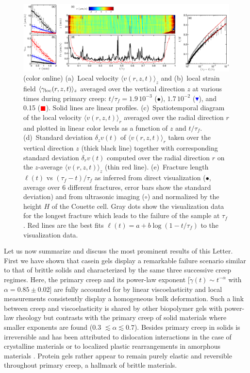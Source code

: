 \documentclass[twocolumn,superscriptaddress,showpacs,preprintnumbers,amsmath,amssymb,prl]{revtex4}
\newcommand\gp{\dot\gamma}
\newcommand\gl{\gamma_{\rm loc}}
\begin{document}
\begin{figure}
\centering
\includegraphics[width=17.5cm,clip]{Fig4.eps}
\caption{(color online) (a)~Local velocity $\langle v(r,z,t)\rangle_z$ and (b)~local strain field $\langle\gl(r,z,t)\rangle_z$ averaged over the vertical direction $z$ at various times during primary creep: $t/\tau_f=1.9\,10^{-3}$ ($\bullet$), $1.7\,10^{-2}$ (\textcolor{blue}{$\blacktriangledown$}), and 0.15 (\textcolor{red}{$\blacksquare$}). Solid lines are linear profiles. (c)~Spatiotemporal diagram of the local velocity $\langle v(r,z,t)\rangle_r$ averaged over the radial direction $r$ and plotted in linear color levels as a function of $z$ and $t/\tau_f$. (d)~Standard deviation $\delta_z v(t)$ of $\langle v(r,z,t)\rangle_r$ taken over the vertical direction $z$ (thick black line) together with corresponding standard deviation $\delta_r v(t)$ computed over the radial direction $r$ on the $z$-average $\langle v(r,z,t)\rangle_z$ (thin red line). (e)~Fracture length $\ell(t)$ vs $(\tau_f-t)/\tau_f$ as inferred from direct visualization ($\bullet$, average over 6 different fractures, error bars show the standard deviation) and from ultrasonic imaging ($\circ$) and normalized by the height $H$ of the Couette cell. Gray dots show the visualization data for the longest fracture which leads to the failure of the sample at $\tau_f$. Red lines are the best fits $\ell(t)=a+b\log(1-t/\tau_f)$ to the visualization data.
\label{fig4}}
\end{figure} 

Let us now summarize and discuss the most prominent results of this Letter. First we have shown that casein gels display a remarkable failure scenario similar to that of brittle solids and characterized by the same three successive creep regimes. Here, the primary creep and its power-law exponent [$\gp(t)\sim t^{-\alpha}$ with $\alpha=0.85\pm 0.02$] are fully accounted for by linear viscoelasticity and local measurements consistently display a homogeneous bulk deformation. Such a link between creep and viscoelasticity is shared by other biopolymer gels with power-law rheology \cite{Jaishankar:2013,Gobeaux:2010} but contrasts with the primary creep of solid materials where smaller exponents are found (0.3 $\lesssim \alpha \lesssim 0.7$). Besides primary creep in solids is irreversible and has been attributed to dislocation interactions in the case of crystalline materials \cite{Miguel:2002} or to localized plastic rearrangements in amorphous materials \cite{Rosti:2010}. Protein gels rather appear to remain purely elastic and reversible throughout primary creep, a hallmark of brittle materials.
\end{document}
